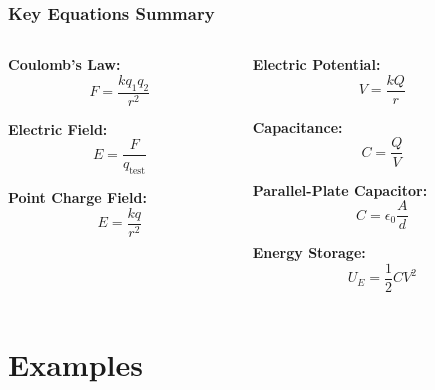 \documentclass{beamer}
\begin{document}
\begin{frame}
    \frametitle{Key Equations Summary}
    \begin{columns}
        \begin{column}{0.5\textwidth}
            \textbf{Coulomb's Law:}
            \begin{equation}
                F = \frac{kq_1q_2}{r^2}
            \end{equation}
            
            \textbf{Electric Field:}
            \begin{equation}
                E = \frac{F}{q_{\text{test}}}
            \end{equation}
            
            \textbf{Point Charge Field:}
            \begin{equation}
                E = \frac{kq}{r^2}
            \end{equation}
        \end{column}
        
        \begin{column}{0.5\textwidth}
            \textbf{Electric Potential:}
            \begin{equation}
                V = \frac{kQ}{r}
            \end{equation}
            
            \textbf{Capacitance:}
            \begin{equation}
                C = \frac{Q}{V}
            \end{equation}
            
            \textbf{Parallel-Plate Capacitor:}
            \begin{equation}
                C = \epsilon_0 \frac{A}{d}
            \end{equation}
            
            \textbf{Energy Storage:}
            \begin{equation}
                U_E = \frac{1}{2}CV^2
            \end{equation}
        \end{column}
    \end{columns}
\end{frame}

\section{Examples}
\end{document}
